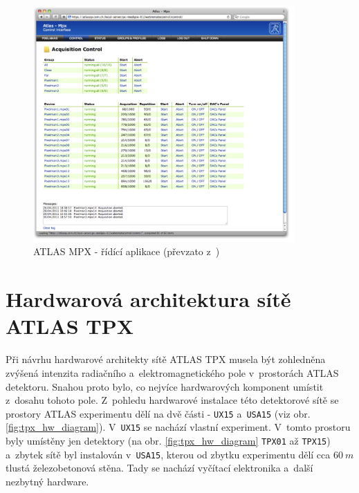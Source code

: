 \begin{figure}[ht]
	\begin{center}
		\includegraphics[width=10cm]{figures/mpx_web.png}
		\caption{ATLAS MPX - řídící aplikace (převzato z~\cite{TurecekThesis2011})}
		\label{fig:mpx_web}
	\end{center}
\end{figure}

\section{Hardwarová architektura sítě ATLAS TPX}\label{atlas:hw_arch}
Při návrhu hardwarové architekty sítě ATLAS TPX musela být zohledněna zvýšená intenzita radiačního a~elektromagnetického pole v~prostorách ATLAS detektoru. Snahou proto bylo, co nejvíce hardwarových komponent umístit z~dosahu tohoto pole. Z~pohledu hardwarové instalace této detektorové sítě se prostory ATLAS experimentu dělí na dvě části - \texttt{UX15} a~\texttt{USA15} (viz obr. \ref{fig:tpx_hw_diagram}). V~\texttt{UX15} se nachází vlastní experiment. V~tomto prostoru byly umístěny jen detektory (na obr. \ref{fig:tpx_hw_diagram} \texttt{TPX01} až \texttt{TPX15}) a~zbytek sítě byl instalován v~\texttt{USA15}, kterou od zbytku experimentu dělí cca $60~m$ tlustá železobetonová stěna. Tady se nachází vyčítací elektronika a~další nezbytný hardware.

